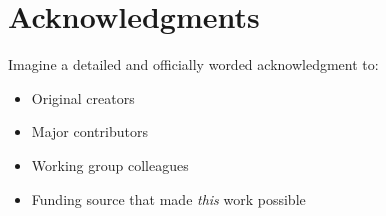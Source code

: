 \chapter*{Acknowledgments}

Imagine a detailed and officially worded acknowledgment to:
\begin{itemize}
 em
\item Original creators
\item Major contributors
\item Working group colleagues
\item Funding source that made \emph{this} work possible
\end{itemize}

